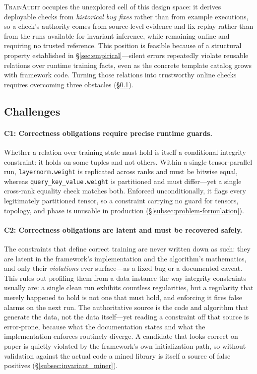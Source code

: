 \documentclass[sigconf,nonacm]{acmart}
\begin{document}
\textsc{TrainAudit} occupies the unexplored cell of this design space: it derives deployable checks from \emph{historical bug fixes} rather than from example executions, so a check's authority comes from source-level evidence and fix replay rather than from the runs available for invariant inference, while remaining online and requiring no trusted reference. This position is feasible because of a structural property established in \S\ref{sec:empirical}---silent errors repeatedly violate reusable relations over runtime training facts, even as the concrete template catalog grows with framework code. Turning those relations into trustworthy online checks requires overcoming three obstacles (\S\ref{subsec:challenges}).

\subsection{Challenges}
\label{subsec:challenges}

\paragraph{C1: Correctness obligations require precise runtime guards.} Whether a relation over training state must hold is itself a conditional integrity constraint: it holds on some tuples and not others. Within a single tensor-parallel run, \texttt{layernorm.weight} is replicated across ranks and must be bitwise equal, whereas \texttt{query\_key\_value.weight} is partitioned and must differ---yet a single cross-rank equality check matches both. Enforced unconditionally, it flags every legitimately partitioned tensor, so a constraint carrying no guard for tensors, topology, and phase is unusable in production (\S\ref{subsec:problem-formulation}).

\paragraph{C2: Correctness obligations are latent and must be recovered safely.} The constraints that define correct training are never written down as such: they are latent in the framework's implementation and the algorithm's mathematics, and only their \emph{violations} ever surface---as a fixed bug or a documented caveat. This rules out profiling them from a data instance the way integrity constraints usually are: a single clean run exhibits countless regularities, but a regularity that merely happened to hold is not one that must hold, and enforcing it fires false alarms on the next run. The authoritative source is the code and algorithm that generate the data, not the data itself---yet reading a constraint off that source is error-prone, because what the documentation states and what the implementation enforces routinely diverge. A candidate that looks correct on paper is quietly violated by the framework's own initialization path, so without validation against the actual code a mined library is itself a source of false positives (\S\ref{subsec:invariant_miner}).
\end{document}
